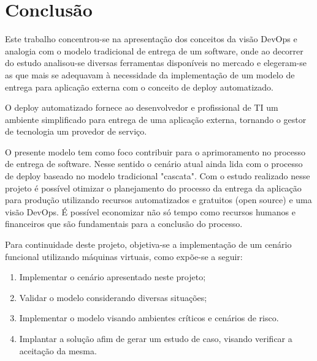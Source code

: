 \chapter{Conclusão}\label{cap:conclusao}

Este trabalho concentrou-se na apresentação dos conceitos da visão DevOps e analogia com o modelo tradicional de entrega de um software, onde ao decorrer do estudo analisou-se diversas ferramentas disponíveis no mercado e elegeram-se as que mais se adequavam à necessidade da implementação de um modelo de entrega para aplicação externa com o conceito de deploy automatizado.

O deploy automatizado fornece ao desenvolvedor e profissional de TI um ambiente simplificado para entrega de uma aplicação externa, tornando o gestor de tecnologia um provedor de serviço.

O presente modelo tem como foco contribuir para o aprimoramento no processo de entrega de software. Nesse sentido o cenário atual ainda lida com o processo de deploy baseado no modelo tradicional "cascata". Com o estudo realizado nesse projeto é possível otimizar o planejamento do processo da entrega da aplicação para produção utilizando recursos automatizados e gratuitos (open source) e uma visão DevOps. É possível economizar não só tempo como recursos humanos e financeiros que são fundamentais para a conclusão do processo.

Para continuidade deste projeto, objetiva-se a implementação de um cenário funcional utilizando máquinas virtuais, como expõe-se a seguir:

\begin{enumerate}
	\item Implementar o cenário apresentado neste projeto;
	\item Validar o modelo considerando diversas situações;
	\item Implementar o modelo visando ambientes críticos e cenários de risco.
	\item Implantar a solução afim de gerar um estudo de caso, visando verificar a aceitação da mesma.
\end{enumerate}
